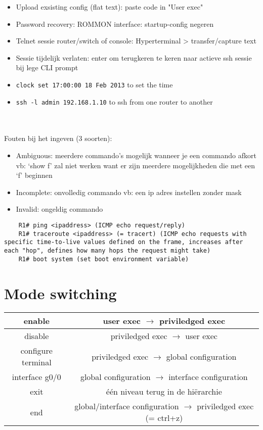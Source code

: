 \documentclass[10pt, a4paper]{article}
\begin{document}
	\begin{itemize}[noitemsep,nolistsep]
		\item Upload exsisting config (flat text): paste code in "User exec"
		\item Password recovery: ROMMON interface: startup-config negeren
		\item Telnet sessie router/switch of console: Hyperterminal > transfer/capture text
		\item Sessie tijdelijk verlaten: enter om terugkeren te keren naar actieve ssh sessie bij lege CLI prompt
		\item \texttt{clock set 17:00:00 18 Feb 2013} to set the time
		\item \texttt{ssh -l admin 192.168.1.10} to ssh from one router to another\\
	\end{itemize}
	\ \\ \\
	
	Fouten bij het ingeven (3 soorten):	
	\begin{itemize}[noitemsep,nolistsep]
		\item Ambiguous: meerdere commando’s mogelijk wanneer je een commando afkort vb: ‘show f’ zal niet werken want er zijn meerdere mogelijkheden die met een ‘f’ beginnen
		\item Incomplete: onvolledig commando vb: een ip adres instellen zonder mask
		\item Invalid: ongeldig commando\\
	\end{itemize}
	
	\begin{lstlisting}
	R1# ping <ipaddress> (ICMP echo request/reply)
	R1# traceroute <ipaddress> (= tracert) (ICMP echo requests with specific time-to-live values defined on the frame, increases after each "hop", defines how many hops the request might take)
	R1# boot system (set boot environment variable)
	\end{lstlisting}
	
	\section{Mode switching}
	\begin{tabular}{|c|c|}
		\hline \rule[-1ex]{0pt}{4ex} enable & user exec $\rightarrow$ priviledged exec  \\
		\hline \rule[-1ex]{0pt}{4ex} disable  & priviledged exec $\rightarrow$ user exec \\ 
		\hline \rule[-1ex]{0pt}{4ex} configure terminal & priviledged exec $\rightarrow$ global configuration \\ 
		\hline \rule[-1ex]{0pt}{4ex} interface g0/0 & global configuration $\rightarrow$ interface configuration \\ 
		\hline \rule[-1ex]{0pt}{4ex} exit & \'{e}\'{e}n niveau terug in de hiërarchie\\
		\hline \rule[-1ex]{0pt}{4ex} end & global/interface configuration $\rightarrow$ priviledged exec (= ctrl+z)  \\ 
		\hline
	\end{tabular} \\
	
\end{document}
